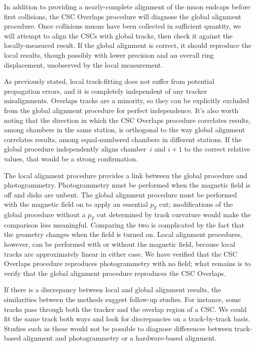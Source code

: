 \documentclass[12pt]{article}
\begin{document}
In addition to providing a nearly-complete alignment of the muon
endcaps before first collisions, the CSC Overlaps procedure will
diagnose the global alignment procedure.  Once collisions muons have
been collected in sufficient quantity, we will attempt to align the
CSCs with global tracks, then check it against the locally-measured
result.  If the global alignment is correct, it should reproduce the
local results, though possibly with lower precision and an overall
ring displacement, unobserved by the local measurement.

As previously stated, local track-fitting does not suffer from
potential propagation errors, and it is completely independent of any
tracker misalignments.  Overlaps tracks are a minority, so they can be
explicitly excluded from the global alignment procedure for perfect
independence.  It's also worth noting that the direction in which the
CSC Overlaps procedure correlates results, among chambers in the same
station, is orthogonal to the way global alignment correlates results,
among equal-numbered chambers in different stations.  If the global
procedure independently aligns chamber~$i$ and $i+1$ to the correct
relative values, that would be a strong confirmation.

The local alignment procedure provides a link between the global
procedure and photogrammetry.  Photogrammetry must be performed when
the magnetic field is off and disks are unbent.  The global alignment
procedure must be performed with the magnetic field on to apply an
essential $p_T$ cut; modifications of the global procedure without a
$p_T$ cut determined by track curvature would make the comparison less
meaningful.  Comparing the two is complicated by the fact that the
geometry changes when the field is turned on.  Local alignment
procedures, however, can be performed with or without the magnetic
field, because local tracks are approximately linear in either case.
We have verified that the CSC Overlaps procedure reproduces
photogrammetry with no field; what remains is to verify that the
global alignment procedure reproduces the CSC Overlaps.

If there is a discrepancy between local and global alignment results,
the similarities between the methods suggest follow-up studies.  For
instance, some tracks pass through both the tracker and the overlap
region of a CSC.  We could fit the same track both ways and look for
discrepancies on a track-by-track basis.  Studies such as these would
not be possible to diagnose differences between track-based alignment
and photogrammetry or a hardware-based alignment.
\end{document}

